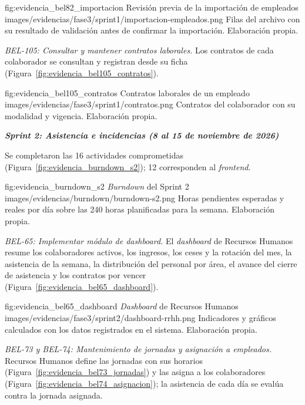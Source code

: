 \figuraEvidenciaCompacta
    {fig:evidencia_bel82_importacion}
    {Revisión previa de la importación de empleados}
    {images/evidencias/fase3/sprint1/importacion-empleados.png}
    {Filas del archivo con su resultado de validación antes de confirmar la importación. Elaboración propia.}

\par\smallskip
\noindent\textit{BEL-105: Consultar y mantener contratos laborales.}
Los contratos de cada colaborador se consultan y registran desde su ficha (Figura~\ref{fig:evidencia_bel105_contratos}).

\figuraEvidenciaCompacta
    {fig:evidencia_bel105_contratos}
    {Contratos laborales de un empleado}
    {images/evidencias/fase3/sprint1/contratos.png}
    {Contratos del colaborador con su modalidad y vigencia. Elaboración propia.}


\par\medskip
\noindent\textbf{\textit{Sprint 2: Asistencia e incidencias (8 al 15 de noviembre de 2026)}}\par
\nobreak
Se completaron las 16 actividades comprometidas (Figura~\ref{fig:evidencia_burndown_s2}); 12 corresponden al \textit{frontend}.

\figuraEvidencia
    {fig:evidencia_burndown_s2}
    {\textit{Burndown} del Sprint 2}
    {images/evidencias/burndown/burndown-s2.png}
    {Horas pendientes esperadas y reales por día sobre las 240 horas planificadas para la semana. Elaboración propia.}

\par\smallskip
\noindent\textit{BEL-65: Implementar módulo de dashboard.}
El \textit{dashboard} de Recursos Humanos resume los colaboradores activos, los ingresos, los ceses y la rotación del mes, 
la asistencia de la semana, la distribución del personal por área, el avance del cierre de asistencia y los contratos por vencer 
(Figura~\ref{fig:evidencia_bel65_dashboard}).

\figuraEvidenciaCompacta
    {fig:evidencia_bel65_dashboard}
    {\textit{Dashboard} de Recursos Humanos}
    {images/evidencias/fase3/sprint2/dashboard-rrhh.png}
    {Indicadores y gráficos calculados con los datos registrados en el sistema. Elaboración propia.}

\par\smallskip
\noindent\textit{BEL-73 y BEL-74: Mantenimiento de jornadas y asignación a empleados.}
Recursos Humanos define las jornadas con sus horarios (Figura~\ref{fig:evidencia_bel73_jornadas})
y las asigna a los colaboradores (Figura~\ref{fig:evidencia_bel74_asignacion});
la asistencia de cada día se evalúa contra la jornada asignada.

